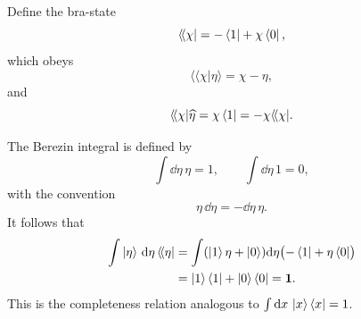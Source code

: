 Define the bra-state
\[
  \langle\!\langle\chi|
  =
  -\bra{1}+\chi\bra{0},
\]
which obeys
\[
  \langle\!\langle\chi|\eta\rangle=\chi-\eta,
\]
and
\[
  \langle\!\langle\chi|\widehat\eta
  =
  \chi\bra{1}
  =
  -\chi\langle\!\langle\chi|.
\]

The Berezin integral is defined by
\[
  \int\dd\eta\,\eta=1,
  \qquad
  \int\dd\eta\,1=0,
\]
with the convention
\[
  \eta\,\dd\eta=-\dd\eta\,\eta.
\]
It follows that
\[
\begin{aligned}
  \int\ket{\eta}\,\mathrm{d}\eta\,\langle\!\langle\eta|
  &=
  \int(\ket{1}\eta+\ket{0})\mathrm{d}\eta
  \bigl(-\bra{1}+\eta\bra{0}\bigr)
  \\
  &=
  \ket{1}\bra{1}+\ket{0}\bra{0}
  =
  \mathbf 1.
\end{aligned}
\]
This is the completeness relation analogous to
\(\int\mathrm{d} x\,\ket{x}\bra{x}=1\).

